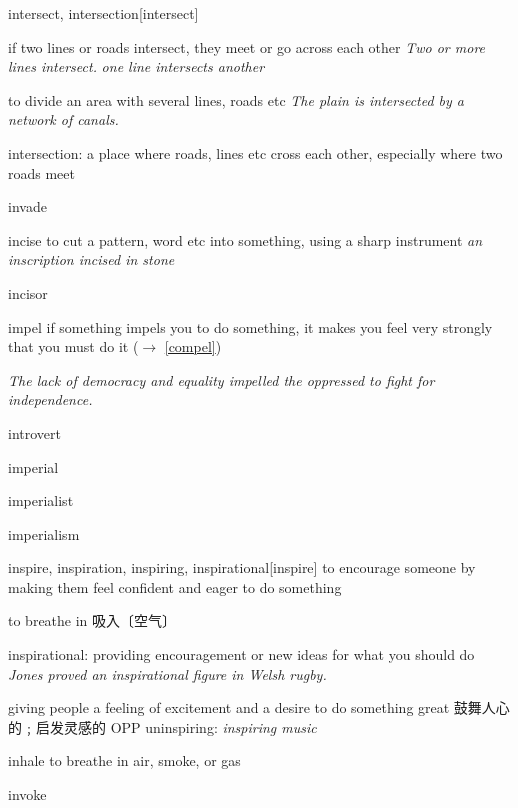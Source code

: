 \begin{DefWord}{intersect, intersection}[intersect]
    
    if two lines or roads intersect, they meet or go across each other
    \textit{Two or more lines intersect.}
    \textit{one line intersects another}

    to divide an area with several lines, roads etc
    \textit{The plain is intersected by a network of canals.}

    intersection: a place where roads, lines etc cross each other, especially where two roads meet
\end{DefWord}

\begin{DefWord}{invade}
\end{DefWord}


\begin{DefWord}{incise}
    to cut a pattern, word etc into something, using a sharp instrument
    \textit{an inscription incised in stone}
\end{DefWord}

\begin{DefWord}{incisor}
\end{DefWord}

\begin{DefWord}{impel}
    if something impels you to do something, it makes you feel very strongly that you must do it ($\rightarrow$ \ref{compel})

    \textit{The lack of democracy and equality impelled the oppressed to fight for independence.}
\end{DefWord}



\begin{DefWord}{introvert}
\end{DefWord}

\begin{DefWord}{imperial}
\end{DefWord}

\begin{DefWord}{imperialist}
\end{DefWord}

\begin{DefWord}{imperialism}
\end{DefWord}

\begin{DefWord}{inspire, inspiration, inspiring, inspirational}[inspire]
    to encourage someone by making them feel confident and eager to do something

    to breathe in 吸入〔空气〕

    inspirational: providing encouragement or new ideas for what you should do
    \textit{Jones proved an inspirational figure in Welsh rugby.}


    giving people a feeling of excitement and a desire to do something great 鼓舞人心的﹔启发灵感的 OPP  uninspiring:
    \textit{inspiring music}
\end{DefWord}

\begin{DefWord}{inhale}
    to breathe in air, smoke, or gas
\end{DefWord}

\begin{DefWord}{invoke}
\end{DefWord}
